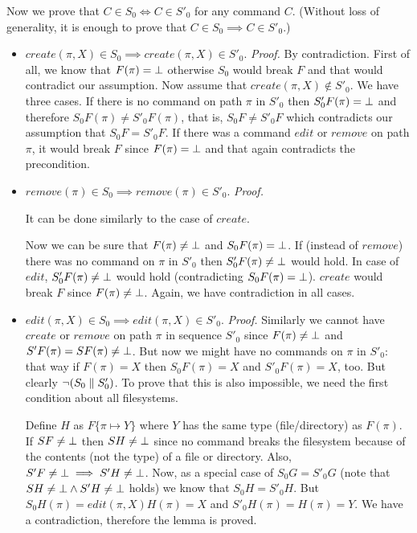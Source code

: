 Now we prove that \(C\in S_0\Longleftrightarrow C\in S'_0\) for any
command \(C\). (Without loss of generality, it is enough to prove that 
\(C\in S_0\implies C\in S'_0\).)
\begin{itemize}
\item \(create(\pi,X)\in S_0\implies create(\pi,X)\in S'_0\). 
\emph{Proof.} By contradiction. First of all, we know that
\(F(\pi)=\bot\) otherwise \(S_0\) would break \(F\) and that would
contradict our assumption. Now assume that 
\(create(\pi,X)\not\in S'_0\). 
We have three cases. If there is no command on path \(\pi\) in
\(S'_0\) then \(S'_0F(\pi)=\bot\) and therefore 
\(S_0F(\pi)\ne S'_0F(\pi)\), that is, \(S_0F\ne S'_0F\) which contradicts
our assumption that \(S_0F=S'_0F\). If there was a command \(edit\) or
\(remove\) on path \(\pi\), it would break \(F\) since \(F(\pi)=\bot\) and
that again contradicts the precondition.

\item \(remove(\pi)\in S_0\implies remove(\pi)\in S'_0\).
\emph{Proof.} 
\begin{forrsi}
It can be done similarly to the case of \(create\).
\end{forrsi}
\begin{notrsi}
Now we can be sure that \(F(\pi)\ne\bot\) and
\(S_0F(\pi)=\bot\). If (instead of
\(remove\)) there was no command on \(\pi\) in \(S'_0\) then 
\(S'_0F(\pi)\ne\bot\)  would hold. In case of \(edit\), 
\(S'_0F(\pi)\ne\bot\) would hold (contradicting
\(S_0F(\pi)=\bot\)). \(create\) would break \(F\) since
\(F(\pi)\ne\bot\). Again, we have contradiction in all cases.
\end{notrsi}

\item \(edit(\pi,X)\in S_0\implies edit(\pi,X)\in S'_0\).
\emph{Proof.} Similarly we cannot have \(create\) or \(remove\) on path
\(\pi\) in sequence \(S'_0\) since \(F(\pi)\ne\bot\) and 
\(S'F(\pi)=SF(\pi)\ne\bot\). 
But now we might have no commands on
\(\pi\) in \(S'_0\): that way if \(F(\pi)=X\) then \(S_0F(\pi)=X\) and
\(S'_0F(\pi)=X\), too. 
But clearly \(\neg(S_0\parallel S'_0)\). To prove that this is also
impossible, we need the first condition about all filesystems. 

Define
\(H\) as \(F\{\pi\mapsto Y\}\) where \(Y\) has the same type
(file/directory) as \(F(\pi)\). If \(SF\ne\bot\) then \(SH\ne\bot\) since no
command breaks the filesystem because of the contents (not the type) of a
file or directory. Also, \(S'F\ne\bot\implies S'H\ne\bot\). Now, as a
special case of \(S_0G=S'_0G\) (note that 
\(SH\ne\bot\wedge S'H\ne\bot\) holds) we know
that \(S_0H=S'_0H\). But \(S_0H(\pi)=edit(\pi,X)H(\pi)=X\) and
\(S'_0H(\pi)=H(\pi)=Y\). We have a contradiction, therefore the lemma is
proved.
\end{itemize}

